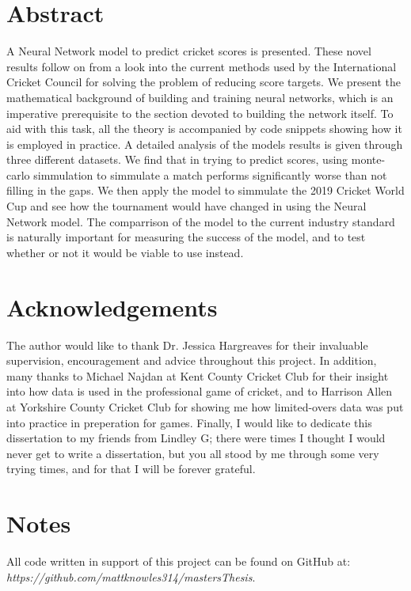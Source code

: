 \documentclass[11pt]{report}
\begin{document}


\section*{Abstract}
A Neural Network model to predict cricket scores is presented. These novel results follow on from a look into the current methods used by the International 
Cricket Council for solving the problem of reducing score targets. We present the mathematical background of building and training neural networks, which is an imperative prerequisite to the section devoted
to building the network itself. To aid with this task, all the theory is accompanied by code snippets showing how it is employed in practice. A detailed analysis of the models results is given through three different
datasets. We find that in trying to predict scores, using monte-carlo simmulation to simmulate a match performs significantly worse than not filling in the gaps. We then apply the model to simmulate the 2019 Cricket 
World Cup and see how the tournament would have changed in using the Neural Network model. The comparrison of the model to the current industry standard is naturally important for measuring the success of the model, 
and to test whether or not it would be viable to use instead. 

\section*{Acknowledgements}
The author would like to thank Dr. Jessica Hargreaves for their invaluable supervision, encouragement and advice throughout this project. In addition,
many thanks to Michael Najdan at Kent County Cricket Club for their insight into how data is used in the professional game of cricket, and to Harrison Allen at Yorkshire County Cricket Club for showing me how limited-overs data was put into practice in preperation for games. 
Finally, I would like to dedicate this dissertation to my friends from Lindley G; there were times I thought I would never get to write a dissertation, but you all stood by me through some very trying times, and for that I will be forever grateful. 

\section*{Notes}
All code written in support of this project can be found on GitHub at: \\
\textit{https://github.com/mattknowles314/mastersThesis}.
\end{document}
